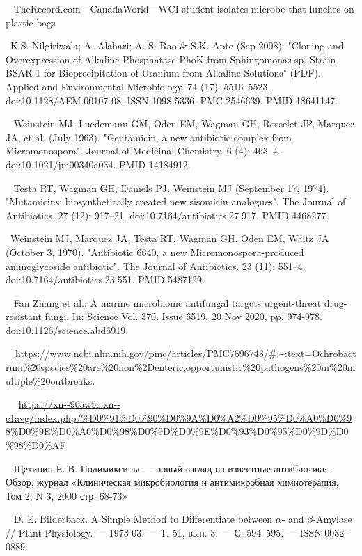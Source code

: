 \documentclass[11pt]{article}
\begin{document}
\begin{thebibliography}{3}
	~ TheRecord.com—CanadaWorld—WCI student isolates microbe that lunches on plastic bags

	~K.S. Nilgiriwala; A. Alahari; A. S. Rao \& S.K. Apte (Sep 2008). "Cloning and Overexpression of Alkaline Phosphatase PhoK from Sphingomonas sp. Strain BSAR-1 for Bioprecipitation of Uranium from Alkaline Solutions" (PDF). Applied and Environmental Microbiology. 74 (17): 5516–5523. doi:10.1128/AEM.00107-08. ISSN 1098-5336. PMC 2546639. PMID 18641147.

	~ Weinstein MJ, Luedemann GM, Oden EM, Wagman GH, Rosselet JP, Marquez JA, et al. (July 1963). "Gentamicin, a new antibiotic complex from Micromonospora". Journal of Medicinal Chemistry. 6 (4): 463–4. doi:10.1021/jm00340a034. PMID 14184912.

	~ Testa RT, Wagman GH, Daniels PJ, Weinstein MJ (September 17, 1974). "Mutamicins; biosynthetically created new sisomicin analogues". The Journal of Antibiotics. 27 (12): 917–21. doi:10.7164/antibiotics.27.917. PMID 4468277.
	
	~Weinstein MJ, Marquez JA, Testa RT, Wagman GH, Oden EM, Waitz JA (October 3, 1970). "Antibiotic 6640, a new Micromonospora-produced aminoglycoside antibiotic". The Journal of Antibiotics. 23 (11): 551–4. doi:10.7164/antibiotics.23.551. PMID 5487129.
	
	~ Fan Zhang et al.: A marine microbiome antifungal targets urgent-threat drug-resistant fungi. In: Science Vol. 370, Issue 6519, 20 Nov 2020, pp. 974-978. doi:10.1126/science.abd6919.

 	~~\url{https://www.ncbi.nlm.nih.gov/pmc/articles/PMC7696743/#:~:text=Ochrobactrum\%20species\%20are\%20non\%2Denteric,opportunistic\%20pathogens\%20in\%20multiple\%20outbreaks.}

	~ ~\url{https://xn--90aw5c.xn--c1avg/index.php/%D0%91%D0%90%D0%9A%D0%A2%D0%95%D0%A0%D0%98%D0%9E%D0%A6%D0%98%D0%9D%D0%9E%D0%93%D0%95%D0%9D%D0%98%D0%AF}

	~
	Щетинин Е. В. Полимиксины — новый взгляд на известные антибиотики. Обзор, журнал «Клиническая микробиология и антимикробная химиотерапия, Том 2, N 3, 2000 стр. 68-73»
	
	~  D. E. Bilderback. A Simple Method to Differentiate between $\alpha$- and $\beta$-Amylase // Plant Physiology. — 1973-03. — Т. 51, вып. 3. — С. 594–595. — ISSN 0032-0889.
	
	\end{thebibliography}
	
\end{document}
